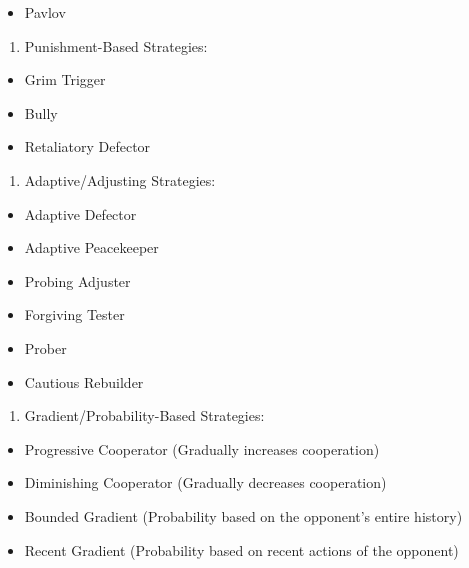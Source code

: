 \documentclass[11pt,preprint]{elsarticle}
\numberwithin{equation}{section}
\numberwithin{figure}{section}
\numberwithin{table}{section}
\def\tightlist{} %
\begin{document}
\begin{itemize}
\tightlist
\item
  Pavlov
\end{itemize}

\begin{enumerate}
\def\labelenumi{\arabic{enumi}.}
\setcounter{enumi}{3}
\tightlist
\item
  Punishment-Based Strategies:
\end{enumerate}

\begin{itemize}
\tightlist
\item
  Grim Trigger
\item
  Bully
\item
  Retaliatory Defector
\end{itemize}

\begin{enumerate}
\def\labelenumi{\arabic{enumi}.}
\setcounter{enumi}{4}
\tightlist
\item
  Adaptive/Adjusting Strategies:
\end{enumerate}

\begin{itemize}
\tightlist
\item
  Adaptive Defector
\item
  Adaptive Peacekeeper
\item
  Probing Adjuster
\item
  Forgiving Tester
\item
  Prober
\item
  Cautious Rebuilder
\end{itemize}

\begin{enumerate}
\def\labelenumi{\arabic{enumi}.}
\setcounter{enumi}{5}
\tightlist
\item
  Gradient/Probability-Based Strategies:
\end{enumerate}

\begin{itemize}
\tightlist
\item
  Progressive Cooperator (Gradually increases cooperation)
\item
  Diminishing Cooperator (Gradually decreases cooperation)
\item
  Bounded Gradient (Probability based on the opponent's entire history)
\item
  Recent Gradient (Probability based on recent actions of the opponent)
\end{itemize}
\end{document}
